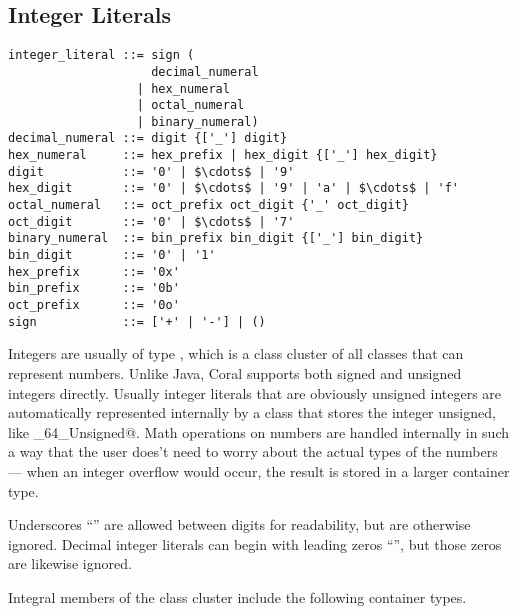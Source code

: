 \subsection{Integer Literals}\label{sec:integerliterals}

\syntax\begin{lstlisting}
integer_literal ::= sign (
                    decimal_numeral
                  | hex_numeral
                  | octal_numeral
                  | binary_numeral)
decimal_numeral ::= digit {['_'] digit}
hex_numeral     ::= hex_prefix | hex_digit {['_'] hex_digit}
digit           ::= '0' | $\cdots$ | '9'
hex_digit       ::= '0' | $\cdots$ | '9' | 'a' | $\cdots$ | 'f'
octal_numeral   ::= oct_prefix oct_digit {'_' oct_digit}
oct_digit       ::= '0' | $\cdots$ | '7'
binary_numeral  ::= bin_prefix bin_digit {['_'] bin_digit}
bin_digit       ::= '0' | '1'
hex_prefix      ::= '0x'
bin_prefix      ::= '0b'
oct_prefix      ::= '0o'
sign            ::= ['+' | '-'] | ()
\end{lstlisting}

Integers are usually of type \lstinline@Number@, which is a class cluster of all classes that can represent numbers. Unlike Java, Coral supports both signed and unsigned integers directly. Usually integer literals that are obviously unsigned integers are automatically represented internally by a class that stores the integer unsigned, like \lstinline@Integer_64_Unsigned@. Math operations on numbers are handled internally in such a way that the user does't need to worry about the actual types of the numbers — when an integer overflow would occur, the result is stored in a larger container type. 

Underscores ``\code{_}'' are allowed between digits for readability, but are otherwise ignored. Decimal integer literals can begin with leading zeros ``'', but those zeros are likewise ignored. 

Integral members of the \lstinline@Number@ class cluster include the following container types. 

